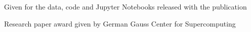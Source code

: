 \begin{resume}
  \begin{position}
    Given for the data, code and Jupyter Notebooks released with the publication
  \end{position}

  \begin{position}
    Research paper award given by German Gauss Center for Supercomputing
  \end{position}










\end{resume}

